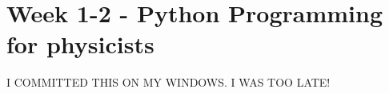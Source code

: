 \documentclass[../main.tex]{subfiles}
\begin{document}
\section{Week 1-2 - Python Programming for physicists}

I COMMITTED THIS ON MY WINDOWS. I WAS TOO LATE!
\end{document}
